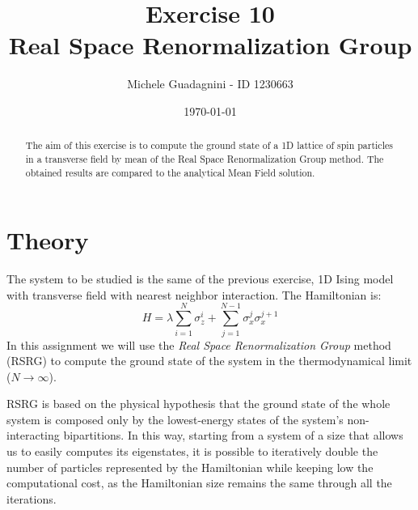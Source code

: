 \documentclass[11pt,a4paper]{article}
\author{Michele Guadagnini - ID 1230663}
\title{\textbf{Exercise 10 \\ Real Space Renormalization Group}}
\date{\today}
\begin{document}
\maketitle

\vspace{20pt}
\begin{abstract}
	The aim of this exercise is to compute the ground state of a 1D lattice of spin particles in a transverse field by mean of the Real Space Renormalization Group method. The obtained results are compared to the analytical Mean Field solution.
\end{abstract}

\section{Theory} %
The system to be studied is the same of the previous exercise, 1D Ising model with transverse field with nearest neighbor interaction. The Hamiltonian is:
\begin{equation}
	H = \lambda \sum_{i=1}^{N} \sigma_{z}^{i} + \sum_{j=1}^{N-1} \sigma_{x}^{j} \sigma_{x}^{j+1} 
	\label{eq:ham}
\end{equation}
In this assignment we will use the \textit{Real Space Renormalization Group} method (RSRG) to compute the ground state of the system in the thermodynamical limit ($N \rightarrow \infty$).

RSRG is based on the physical hypothesis that the ground state of the whole system is composed only by the lowest-energy states of the system's non-interacting bipartitions.
In this way, starting from a system of a size that allows us to easily computes its eigenstates, it is possible to iteratively double the number of particles represented by the Hamiltonian while keeping low the computational cost, as the Hamiltonian size remains the same through all the iterations.
\end{document}
